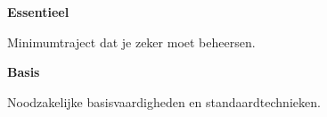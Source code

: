 \noindent
\begin{minipage}[t]{0.48\linewidth}

  \begin{minipage}[t]{14mm}
    \centering
    \ESS
  \end{minipage}%
  \hspace{2mm}%
  \begin{minipage}[t]{\dimexpr\linewidth-18mm\relax}

    \textbf{Essentieel}

    \vspace{1mm}

    \small
    Minimumtraject dat je zeker moet beheersen.

  \end{minipage}

\end{minipage}%
\hfill
\begin{minipage}[t]{0.48\linewidth}

  \begin{minipage}[t]{14mm}
    \centering
    \oefB
  \end{minipage}%
  \hspace{2mm}%
  \begin{minipage}[t]{\dimexpr\linewidth-18mm\relax}

    \textbf{Basis}

    \vspace{1mm}

    \small
    Noodzakelijke basisvaardigheden en standaardtechnieken.

  \end{minipage}

\end{minipage}


\vspace{6mm}



